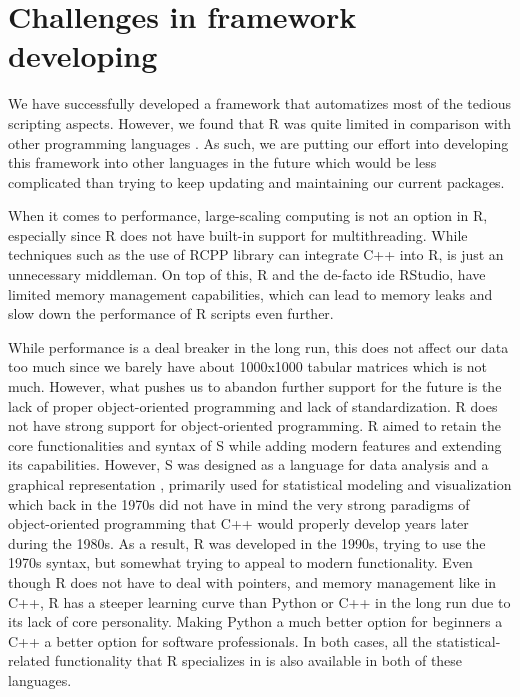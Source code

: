 \section{Challenges in framework developing}

We have successfully developed a framework that automatizes most of the tedious scripting aspects. However, we found that R was quite limited in comparison with other programming languages \cite{Burns2012-tj}. As such, we are putting our effort into developing this framework into other languages in the future which would be less complicated than trying to keep updating and maintaining our current packages.

When it comes to performance, large-scaling computing is not an option in R, especially since R does not have built-in support for multithreading. While techniques such as the use of RCPP library \cite{Eddelbuettel2013} can integrate C++ into R, is just an unnecessary middleman. On top of this, R and the de-facto \gls{ide} RStudio, have limited memory management capabilities, which can lead to memory leaks and slow down the performance of R scripts even further. 

While performance is a deal breaker in the long run, this does not affect our data too much since we barely have about 1000x1000 tabular matrices which is not much. However, what pushes us to abandon further support for the future is the lack of proper object-oriented programming and lack of standardization. R does not have strong support for object-oriented programming. R aimed to retain the core functionalities and syntax of S while adding modern features and extending its capabilities. However, S was designed as a language for data analysis and a graphical representation \cite{Chambers2004-sc}, primarily used for statistical modeling and visualization which back in the 1970s did not have in mind the very strong paradigms of object-oriented programming that C++ would properly develop years later during the 1980s. As a result, R was developed in the 1990s, trying to use the 1970s syntax, but somewhat trying to appeal to modern functionality. Even though R does not have to deal with pointers, and memory management like in C++, R has a steeper learning curve than Python or C++ in the long run due to its lack of core personality. Making Python a much better option for beginners a C++ a better option for software professionals. In both cases, all the statistical-related functionality that R specializes in is also available in both of these languages.

